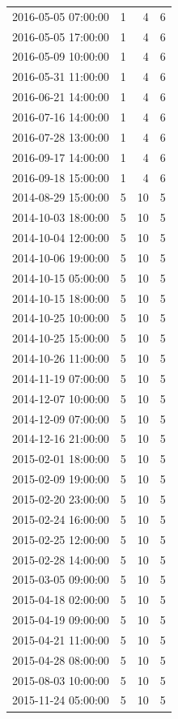 \begin{tabular}{lrrr}
2016-05-05 07:00:00 & 1 & 4 & 6 \\
2016-05-05 17:00:00 & 1 & 4 & 6 \\
2016-05-09 10:00:00 & 1 & 4 & 6 \\
2016-05-31 11:00:00 & 1 & 4 & 6 \\
2016-06-21 14:00:00 & 1 & 4 & 6 \\
2016-07-16 14:00:00 & 1 & 4 & 6 \\
2016-07-28 13:00:00 & 1 & 4 & 6 \\
2016-09-17 14:00:00 & 1 & 4 & 6 \\
2016-09-18 15:00:00 & 1 & 4 & 6 \\
2014-08-29 15:00:00 & 5 & 10 & 5 \\
2014-10-03 18:00:00 & 5 & 10 & 5 \\
2014-10-04 12:00:00 & 5 & 10 & 5 \\
2014-10-06 19:00:00 & 5 & 10 & 5 \\
2014-10-15 05:00:00 & 5 & 10 & 5 \\
2014-10-15 18:00:00 & 5 & 10 & 5 \\
2014-10-25 10:00:00 & 5 & 10 & 5 \\
2014-10-25 15:00:00 & 5 & 10 & 5 \\
2014-10-26 11:00:00 & 5 & 10 & 5 \\
2014-11-19 07:00:00 & 5 & 10 & 5 \\
2014-12-07 10:00:00 & 5 & 10 & 5 \\
2014-12-09 07:00:00 & 5 & 10 & 5 \\
2014-12-16 21:00:00 & 5 & 10 & 5 \\
2015-02-01 18:00:00 & 5 & 10 & 5 \\
2015-02-09 19:00:00 & 5 & 10 & 5 \\
2015-02-20 23:00:00 & 5 & 10 & 5 \\
2015-02-24 16:00:00 & 5 & 10 & 5 \\
2015-02-25 12:00:00 & 5 & 10 & 5 \\
2015-02-28 14:00:00 & 5 & 10 & 5 \\
2015-03-05 09:00:00 & 5 & 10 & 5 \\
2015-04-18 02:00:00 & 5 & 10 & 5 \\
2015-04-19 09:00:00 & 5 & 10 & 5 \\
2015-04-21 11:00:00 & 5 & 10 & 5 \\
2015-04-28 08:00:00 & 5 & 10 & 5 \\
2015-08-03 10:00:00 & 5 & 10 & 5 \\
2015-11-24 05:00:00 & 5 & 10 & 5 \\

\end{tabular}
